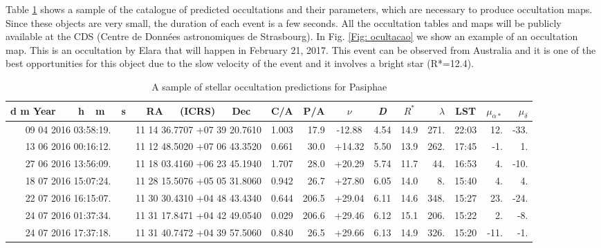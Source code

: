 \documentclass[useAMS,usenatbib]{mn2e}
\begin{document}
Table \ref{Tab: sample-cds} shows a sample of the catalogue of predicted occultations and their parameters, which are necessary to produce occultation maps. Since these objects are very small, the duration of each event is a few seconds. All the occultation tables and maps will be publicly available at the CDS (Centre de Données astronomiques de Strasbourg). In Fig. \ref{Fig: ocultacao} we show an example of an occultation map. This is an occultation by Elara that will happen in February 21, 2017. This event can be observed from Australia and it is one of the best opportunities for this object due to the slow velocity of the event and it involves a bright star (R*=12.4).

\begin{table}
\caption{\label{Tab: sample-cds} A sample of stellar occultation predictions for Pasiphae}
\begin{center}
\begin{tabular}{cccrcccrcrr}
\hline
\hline
d m Year~~~~h~~m~~~s & RA~~~(ICRS)~~~Dec & C/A & P/A & $\nu$ &{\it D} & $R^*$ & $\lambda$ & LST & $\mu_{\alpha*}$ & $\mu_{\delta}$ \tabularnewline
\hline
09 04 2016 03:58:19. & 11 14 36.7707 +07 39 20.7610 & 1.003 &  17.9 & -12.88 &  4.54 & 14.9 & 271. & 22:03 &  12. & -33. \tabularnewline 
13 06 2016 00:16:12. & 11 12 48.5020 +07 06 43.3520 & 0.661 &  30.0 & +14.32 &  5.50 & 13.9 & 262. & 17:45 &  -1. &   1. \tabularnewline 
27 06 2016 13:56:09. & 11 18 03.4160 +06 23 45.1940 & 1.707 &  28.0 & +20.29 &  5.74 & 11.7 &  44. & 16:53 &   4. & -10. \tabularnewline 
18 07 2016 15:07:24. & 11 28 15.5076 +05 05 31.8060 & 0.942 &  26.7 & +27.80 &  6.05 & 14.0 &   8. & 15:40 &   4. &   4. \tabularnewline 
22 07 2016 16:15:07. & 11 30 30.4310 +04 48 43.4340 & 0.644 & 206.5 & +29.04 &  6.11 & 14.6 & 348. & 15:27 &  23. & -24. \tabularnewline 
24 07 2016 01:37:34. & 11 31 17.8471 +04 42 49.0540 & 0.029 & 206.6 & +29.46 &  6.12 & 15.1 & 206. & 15:22 &   2. &  -8. \tabularnewline 
24 07 2016 17:37:18. & 11 31 40.7472 +04 39 57.5060 & 0.840 &  26.5 & +29.66 &  6.13 & 14.9 & 326. & 15:20 & -11. &  -1. \tabularnewline 
\hline
\end{tabular}
\end{center}
\begin{flushleft}

\end{flushleft}
\end{table}
\end{document}
